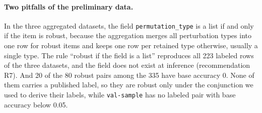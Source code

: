 \paragraph{Two pitfalls of the preliminary data.} In the three aggregated datasets, the field \texttt{permutation\_type} is a list if and only if the item is robust, because the aggregation merges all perturbation types into one row for robust items and keeps one row per retained type otherwise, usually a single type. The rule ``robust if the field is a list'' reproduces all 223 labeled rows of the three datasets, and the field does not exist at inference (recommendation R7). And 20 of the 80 robust pairs among the 335 have base accuracy 0. None of them carries a published label, so they are robust only under the conjunction we used to derive their labels, while \texttt{val-sample} has no labeled pair with base accuracy below 0.05.
